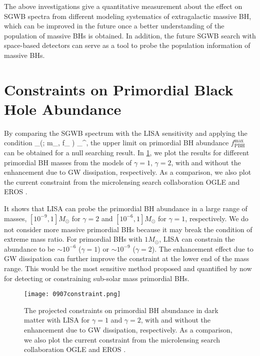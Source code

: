 The above investigations give a  quantitative measurement about the effect on \ac{SGWB} spectra from different modeling systematics of extragalactic massive \ac{BH}, which can be improved in the future once a better understanding of the population of massive \acp{BH} is obtained.
In addition, the future \ac{SGWB} search with space-based detectors can serve as a tool to probe the population information of massive \acp{BH}.

\section{Constraints on Primordial Black Hole Abundance}\label{sec:PBH-EMRI-constraint}

By comparing the \ac{SGWB} spectrum with the LISA sensitivity and applying the condition
\be
\Omega_(\nu; m_, f_ ) \leq \Omega_^,
\ee
the upper limit on primordial \ac{BH} abundance $f^\text{max}_\text{PBH}$ can be obtained for a null searching result.
In \cref{Fig:constraints}, we plot the results for different primordial \ac{BH} masses from the models of $\gamma=1$, $\gamma=2$, with and without the enhancement due to \ac{GW} dissipation, respectively.
As a comparison, we also plot the current constraint from the microlensing search collaboration OGLE \cite{OGLE2019} and EROS \cite{EROS2006}.

It shows that LISA can probe the primordial \ac{BH} abundance in a large range of masses, $[10^{-9}, 1] M_\odot$ for  $\gamma=2$ and $[10^{-6}, 1] M_\odot$ for  $\gamma=1$, respectively. 
We do not consider more massive primordial \acp{BH} because it may break the condition of extreme mass ratio.
For primordial \acp{BH} with $1 M_\odot$, LISA can constrain the abundance to be $\sim10^{-6}$ ($\gamma=1$) or $\sim10^{-9}$ ($\gamma=2$). 
The enhancement effect due to \ac{GW} dissipation can further improve the constraint at the lower end of the mass range.
This would be the most sensitive method proposed and quantified by now for detecting or constraining sub-solar mass primordial \acp{BH}.

\begin{figure}[htbp]
   \centering
   \texttt{[image: 0907constraint.png]}
   \caption{The projected constraints on primordial \ac{BH} abundance in dark matter with \ac{LISA} for $\gamma=1$ and $\gamma=2$, with and without the enhancement due to \ac{GW} dissipation, respectively.
   As a comparison, we also plot the current constraint from the microlensing search collaboration OGLE \cite{OGLE2019} and EROS \cite{EROS2006}.
   }\label{Fig:constraints}
\end{figure}


